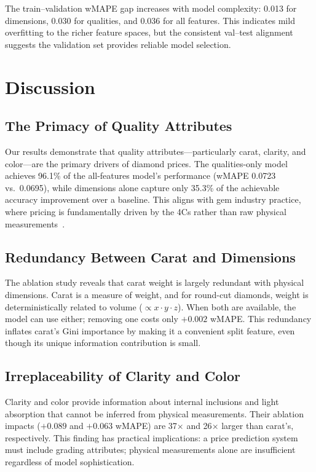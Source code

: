 \documentclass[conference]{IEEEtran}
\begin{document}
The train--validation wMAPE gap increases with model complexity: 0.013 for dimensions, 0.030 for qualities, and 0.036 for all features. This indicates mild overfitting to the richer feature spaces, but the consistent val--test alignment suggests the validation set provides reliable model selection.

\section{Discussion}

\subsection{The Primacy of Quality Attributes}

Our results demonstrate that quality attributes---particularly carat, clarity, and color---are the primary drivers of diamond prices. The qualities-only model achieves 96.1\% of the all-features model's performance (wMAPE 0.0723 vs.\ 0.0695), while dimensions alone capture only 35.3\% of the achievable accuracy improvement over a baseline. This aligns with gem industry practice, where pricing is fundamentally driven by the 4Cs rather than raw physical measurements~\cite{b1}.

\subsection{Redundancy Between Carat and Dimensions}

The ablation study reveals that carat weight is largely redundant with physical dimensions. Carat is a measure of weight, and for round-cut diamonds, weight is deterministically related to volume ($\propto x \cdot y \cdot z$). When both are available, the model can use either; removing one costs only $+0.002$ wMAPE. This redundancy inflates carat's Gini importance by making it a convenient split feature, even though its unique information contribution is small.

\subsection{Irreplaceability of Clarity and Color}

Clarity and color provide information about internal inclusions and light absorption that cannot be inferred from physical measurements. Their ablation impacts ($+0.089$ and $+0.063$ wMAPE) are 37$\times$ and 26$\times$ larger than carat's, respectively. This finding has practical implications: a price prediction system must include grading attributes; physical measurements alone are insufficient regardless of model sophistication.
\end{document}
